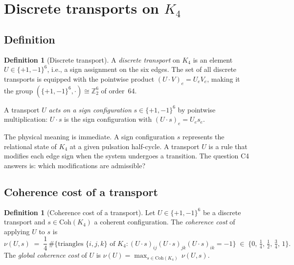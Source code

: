 \documentclass[11pt,a4paper]{article}
\theoremstyle{plain}
\theoremstyle{definition}
\newtheorem{definition}[theorem]{Definition}
\theoremstyle{remark}
\newcommand{\Kfour}{K_4}
\newcommand{\Coh}{\mathrm{Coh}(K_4)}
\begin{document}
\section{Discrete transports on \texorpdfstring{$\Kfour$}{K4}}
\label{sec:transport}

\subsection{Definition}

\begin{definition}[Discrete transport]
\label{def:transport}
A \emph{discrete transport} on $\Kfour$ is an element $U \in \{+1,-1\}^6$, i.e., a
sign assignment on the six edges. The set of all discrete transports is equipped with
the pointwise product $(U \cdot V)_e = U_e V_e$, making it the group
$(\{+1,-1\}^6, \cdot) \cong \mathbb{Z}_2^6$ of order~64.

A transport $U$ \emph{acts on a sign configuration} $s \in \{+1,-1\}^6$ by pointwise
multiplication: $U \cdot s$ is the sign configuration with $(U \cdot s)_e = U_e s_e$.
\end{definition}

The physical meaning is immediate. A sign configuration $s$ represents the
relational state of $\Kfour$ at a given pulsation half-cycle. A transport $U$ is a
rule that modifies each edge sign when the system undergoes a transition. The
question C4 answers is: which modifications are admissible?

\subsection{Coherence cost of a transport}

\begin{definition}[Coherence cost of a transport]
\label{def:cost}
Let $U \in \{+1,-1\}^6$ be a discrete transport and $s \in \Coh$ a coherent
configuration. The \emph{coherence cost} of applying $U$ to $s$ is
\begin{equation}
\nu(U, s) \;=\; \frac{1}{4}\,\#\bigl\{\text{triangles } \{i,j,k\} \text{ of } \Kfour :
(U \cdot s)_{ij}(U \cdot s)_{jk}(U \cdot s)_{ik} = -1 \bigr\}
\;\in\; \bigl\{0,\,\tfrac{1}{4},\,\tfrac{1}{2},\,\tfrac{3}{4},\,1\bigr\}.
\label{eq:cost}
\end{equation}
The \emph{global coherence cost} of $U$ is
$\nu(U) = \max_{s \in \Coh}\, \nu(U, s)$.
\end{definition}
\end{document}
